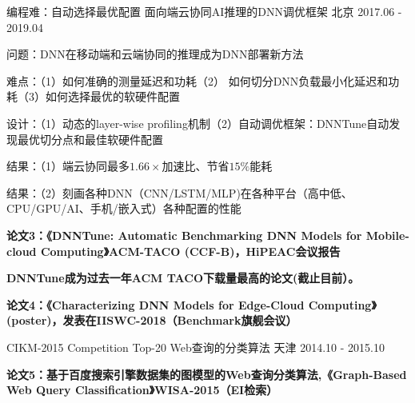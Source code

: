 \begin{cventries}
  \cventry
    {编程难：自动选择最优配置} %
    {面向端云协同AI推理的DNN调优框架} %
    {北京} %
    {2017.06 - 2019.04} %
    {
      \begin{cvitems} %
        \item {问题：DNN在移动端和云端协同的推理成为DNN部署新方法}
        \item {难点：（1）如何准确的测量延迟和功耗（2） 如何切分DNN负载最小化延迟和功耗（3）如何选择最优的软硬件配置}
        \item {设计：（1）动态的layer-wise profiling机制（2）自动调优框架：DNNTune自动发现最优切分点和最佳软硬件配置}
        \item {结果：（1）端云协同最多$1.66\times$加速比、节省$15\%$能耗}
        \item {结果：（2）刻画各种DNN（CNN/LSTM/MLP)在各种平台（高中低、CPU/GPU/AI、手机/嵌入式）各种配置的性能}
        \item {\textbf{{\color{awesome-red}论文3}：《DNNTune: Automatic Benchmarking DNN Models for Mobile-cloud Computing》{\color{awesome-red}ACM-TACO (CCF-B)，HiPEAC会议报告}}}
        \item {\textbf{\color{awesome-red}DNNTune成为过去一年ACM TACO下载量最高的论文(截止目前）。}}
        \item {\textbf{{\color{awesome-red}论文4}：《Characterizing DNN Models for Edge-Cloud Computing》(poster)，发表在\textbf{IISWC-2018（Benchmark旗舰会议）}}}
      \end{cvitems}
    }

  \cventry
    {CIKM-2015 Competition Top-20} %
    {Web查询的分类算法} %
    {天津} %
    {2014.10 - 2015.10} %
    {
      \begin{cvitems} %
        \item {\textbf{{\color{awesome-red}论文5}：基于百度搜索引擎数据集的图模型的Web查询分类算法,《Graph-Based Web Query Classification》WISA-2015（EI检索）}}
      \end{cvitems}
    }


\end{cventries}
